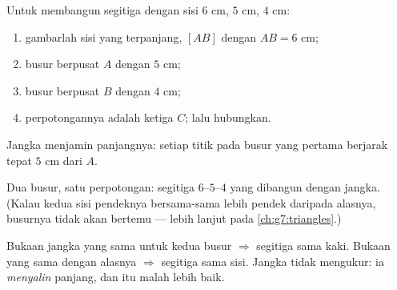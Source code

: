 \begin{method}\label{met:g5:geometry:triangle}
Untuk membangun segitiga dengan sisi $6$ cm, $5$ cm, $4$ cm:
\begin{enumerate}
  \item gambarlah sisi yang terpanjang, $[AB]$ dengan $AB = 6$ cm;
  \item busur berpusat $A$ dengan  $5$ cm;
  \item busur berpusat $B$ dengan  $4$ cm;
  \item perpotongannya adalah  ketiga $C$; lalu hubungkan.
\end{enumerate}
Jangka menjamin panjangnya: setiap titik pada busur yang pertama
berjarak tepat $5$ cm dari $A$.
\end{method}

\begin{omfigure}

{\small Dua busur, satu perpotongan: segitiga $6$--$5$--$4$ yang
dibangun dengan jangka. (Kalau kedua sisi pendeknya bersama-sama
lebih pendek daripada alasnya, busurnya tidak akan bertemu --- lebih
lanjut pada \cref{ch:g7:triangles}.)}
\end{omfigure}

\begin{example}\label{ex:g5:geometry:special}
Bukaan jangka yang sama untuk kedua busur $\Rightarrow$ segitiga
sama kaki. Bukaan yang sama dengan alasnya $\Rightarrow$ segitiga
sama sisi. Jangka tidak mengukur: ia \emph{menyalin} panjang, dan
itu malah lebih baik.
\end{example}

